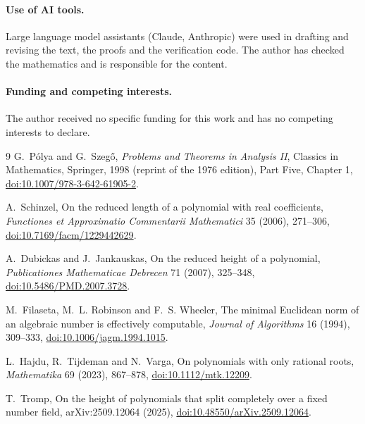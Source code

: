 \documentclass[11pt]{article}
\theoremstyle{definition}
\theoremstyle{plain}
\begin{document}
\paragraph{Use of AI tools.}
Large language model assistants (Claude, Anthropic) were used in drafting
and revising the text, the proofs and the verification code.  The author has checked the mathematics and is responsible
for the content.

\paragraph{Funding and competing interests.}
The author received no specific funding for this work and has no competing
interests to declare.

\begin{thebibliography}{9}
\small
{}
G.~P\'olya and G.~Szeg\H{o},
\newblock \emph{Problems and Theorems in Analysis II},
\newblock Classics in Mathematics, Springer, 1998 (reprint of the 1976
  edition), Part Five, Chapter 1,
\newblock \href{https://doi.org/10.1007/978-3-642-61905-2}
{doi:10.1007/978-3-642-61905-2}.

A.~Schinzel,
\newblock On the reduced length of a polynomial with real coefficients,
\newblock \emph{Functiones et Approximatio Commentarii Mathematici} 35 (2006), 271--306,
\newblock \href{https://doi.org/10.7169/facm/1229442629}
{doi:10.7169/facm/1229442629}.

A.~Dubickas and J.~Jankauskas,
\newblock On the reduced height of a polynomial,
\newblock \emph{Publicationes Mathematicae Debrecen} 71 (2007), 325--348,
\newblock \href{https://doi.org/10.5486/PMD.2007.3728}
{doi:10.5486/PMD.2007.3728}.

M.~Filaseta, M.~L. Robinson and F.~S. Wheeler,
\newblock The minimal Euclidean norm of an algebraic number is effectively
computable,
\newblock \emph{Journal of Algorithms} 16 (1994), 309--333,
\newblock \href{https://doi.org/10.1006/jagm.1994.1015}
{doi:10.1006/jagm.1994.1015}.

L.~Hajdu, R.~Tijdeman and N.~Varga,
\newblock On polynomials with only rational roots,
\newblock \emph{Mathematika} 69 (2023), 867--878,
\newblock \href{https://doi.org/10.1112/mtk.12209}
{doi:10.1112/mtk.12209}.

T.~Tromp,
\newblock On the height of polynomials that split completely over a fixed
number field,
\newblock arXiv:2509.12064 (2025),
\newblock \href{https://doi.org/10.48550/arXiv.2509.12064}
{doi:10.48550/arXiv.2509.12064}.


\end{thebibliography}
\end{document}
